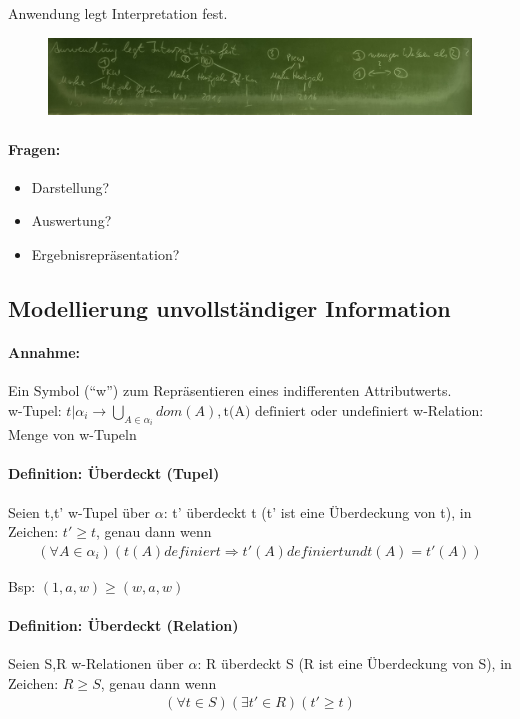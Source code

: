 \documentclass[12pt, a4paper]{article}
\begin{document}
Anwendung legt Interpretation fest.

\begin{figure}
\centering
\includegraphics[width=0.9\linewidth]{img/img31}
\caption{}
\label{fig:img31}
\end{figure}


\paragraph{Fragen:}
\begin{itemize}
\item Darstellung?
\item Auswertung?
\item Ergebnisrepräsentation?
\end{itemize}

\subsection*{Modellierung unvollständiger Information}
\paragraph{Annahme:} Ein Symbol (``w'') zum Repräsentieren eines indifferenten Attributwerts. \\
w-Tupel: $t | \alpha_i \rightarrow \bigcup_{A \in \alpha_i} dom(A), \text{t(A) definiert oder undefiniert}$
w-Relation: Menge von w-Tupeln

\paragraph{Definition: Überdeckt (Tupel)}
Seien t,t' w-Tupel über $\alpha$: t' überdeckt t (t' ist eine Überdeckung von t), in Zeichen: $t' \ge t$, genau dann wenn 
\begin{align*}
(\forall A \in \alpha_i)(t(A) definiert \Rightarrow t'(A) definiert und t(A) = t'(A))
\end{align*}

Bsp: $(1,a,w) \ge (w,a,w)$

\paragraph{Definition: Überdeckt (Relation)}
Seien S,R w-Relationen über $\alpha$: R überdeckt S (R ist eine Überdeckung von S), in Zeichen: $R \ge S$, genau dann wenn
\begin{align*}
(\forall t \in S)(\exists t' \in R)(t' \ge t)
\end{align*} 
\end{document}

